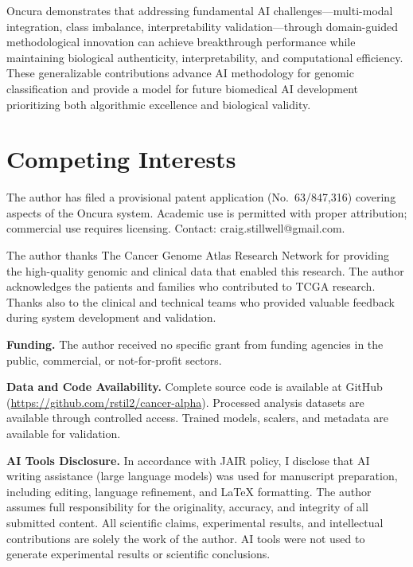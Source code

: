 \documentclass[manuscript, screen, review]{jair}
\begin{document}
Oncura demonstrates that addressing fundamental AI challenges---multi-modal integration, class imbalance, interpretability validation---through domain-guided methodological innovation can achieve breakthrough performance while maintaining biological authenticity, interpretability, and computational efficiency. These generalizable contributions advance AI methodology for genomic classification and provide a model for future biomedical AI development prioritizing both algorithmic excellence and biological validity.


\section*{Competing Interests}

The author has filed a provisional patent application (No.\ 63/847,316) covering aspects of the Oncura system. Academic use is permitted with proper attribution; commercial use requires licensing. Contact: craig.stillwell@gmail.com.

\begin{acks}
The author thanks The Cancer Genome Atlas Research Network for providing the high-quality genomic and clinical data that enabled this research. The author acknowledges the patients and families who contributed to TCGA research. Thanks also to the clinical and technical teams who provided valuable feedback during system development and validation.

\textbf{Funding.} The author received no specific grant from funding agencies in the public, commercial, or not-for-profit sectors.

\textbf{Data and Code Availability.} Complete source code is available at GitHub (\url{https://github.com/rstil2/cancer-alpha}). Processed analysis datasets are available through controlled access. Trained models, scalers, and metadata are available for validation.

\textbf{AI Tools Disclosure.} In accordance with JAIR policy, I disclose that AI writing assistance (large language models) was used for manuscript preparation, including editing, language refinement, and \LaTeX{} formatting. The author assumes full responsibility for the originality, accuracy, and integrity of all submitted content. All scientific claims, experimental results, and intellectual contributions are solely the work of the author. AI tools were not used to generate experimental results or scientific conclusions.
\end{acks}
\end{document}
